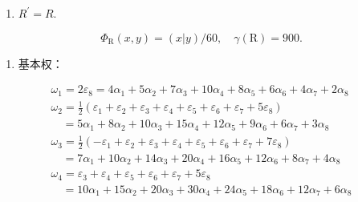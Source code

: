 \begin{enumerate}
\def\labelenumi{(\Alph{enumi})}
\setcounter{enumi}{21}
\tightlist
\item
  \(R^{\prime} = R.\)
\end{enumerate}

\[
  \Phi_ {\mathrm{R}} (x, y) = (x | y) / 60, \quad \gamma (\mathrm{R}) = 900.
\]

\begin{enumerate}
\def\labelenumi{(\Roman{enumi})}
\setcounter{enumi}{5}
\tightlist
\item
  基本权：
\end{enumerate}

\[
\begin{array}{l} \omega_ {1} = 2 \varepsilon_ {8} = 4 \alpha_ {1} + 5 \alpha_ {2} + 7 \alpha_ {3} + 10 \alpha_ {4} + 8 \alpha_ {5} + 6 \alpha_ {6} + 4 \alpha_ {7} + 2 \alpha_ {8} \\ \omega_ {2} = \frac {1}{2} (\varepsilon_ {1} + \varepsilon_ {2} + \varepsilon_ {3} + \varepsilon_ {4} + \varepsilon_ {5} + \varepsilon_ {6} + \varepsilon_ {7} + 5 \varepsilon_ {8}) \\ \quad = 5 \alpha_ {1} + 8 \alpha_ {2} + 10 \alpha_ {3} + 15 \alpha_ {4} + 12 \alpha_ {5} + 9 \alpha_ {6} + 6 \alpha_ {7} + 3 \alpha_ {8} \\ \omega_ {3} = \frac {1}{2} (- \varepsilon_ {1} + \varepsilon_ {2} + \varepsilon_ {3} + \varepsilon_ {4} + \varepsilon_ {5} + \varepsilon_ {6} + \varepsilon_ {7} + 7 \varepsilon_ {8}) \\ \quad = 7 \alpha_ {1} + 10 \alpha_ {2} + 14 \alpha_ {3} + 20 \alpha_ {4} + 16 \alpha_ {5} + 12 \alpha_ {6} + 8 \alpha_ {7} + 4 \alpha_ {8} \\ \omega_ {4} = \varepsilon_ {3} + \varepsilon_ {4} + \varepsilon_ {5} + \varepsilon_ {6} + \varepsilon_ {7} + 5 \varepsilon_ {8} \\ \quad = 10 \alpha_ {1} + 15 \alpha_ {2} + 20 \alpha_ {3} + 30 \alpha_ {4} + 24 \alpha_ {5} + 18 \alpha_ {6} + 12 \alpha_ {7} + 6 \alpha_ {8} \end{array}
\]

